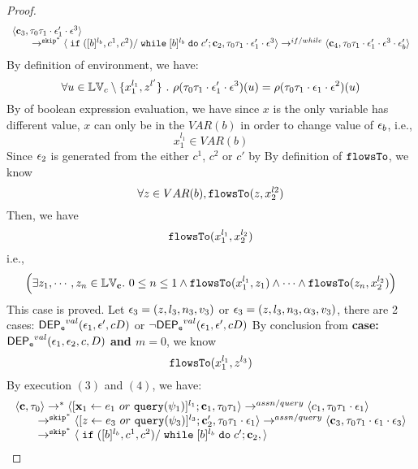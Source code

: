 \begin{proof}
\[\begin{array}{l}
  \langle {\boldsymbol{\mathbf{c}}}_3,  \mathtt{\tau}_0 \mathtt{\tau}_1 \cdot \mathtt{\epsilon}_1' \cdot \mathtt{\epsilon}^3 \rangle 
  \\ 
  \qquad \rightarrow^{\mathtt{skip}^*} 
  \langle \;\mathtt{if}\;([b]{}^{l_b}, c^1, c^2) / \;\mathtt{while}\; [b]{}^{l_b} \;\mathtt{do}\; c'; {\boldsymbol{\mathbf{c}}}_2, 
  \mathtt{\tau}_0 \mathtt{\tau}_1 \cdot \mathtt{\epsilon}_1' \cdot \mathtt{\epsilon}^3 \rangle 
  \rightarrow^{if / while} 
  \langle {\boldsymbol{\mathbf{c}}}_4,  \mathtt{\tau}_0 \mathtt{\tau}_1 \cdot \mathtt{\epsilon}_1' \cdot \mathtt{\epsilon}^3 \cdot \mathtt{\epsilon}_b' \rangle 
\end{array}
 \]
 By definition of environment, we have:
\[
  \forall u \in \mathbb{LV}_c \setminus \{x_1^{l_1}, z^{l'}\} ~.~
  \rho(\mathtt{\tau}_0 \mathtt{\tau}_1 \cdot \mathtt{\epsilon}_1' \cdot \mathtt{\epsilon}^3) (u) =  
  \rho(\mathtt{\tau}_0 \mathtt{\tau}_1 \cdot \mathtt{\epsilon}_1 \cdot \mathtt{\epsilon}^2) (u)
\]
%
By  of boolean expression evaluation, we have since $x$ is the only variable has different value, $x$ can only be in the $VAR(b)$ in order to change value of $\mathtt{\epsilon}_b$, i.e.,
 \[
  x_1^{l_1} \in VAR(b)
 \]
 Since $\mathtt{\epsilon}_2$ is generated from the either $c^1$, $c^2$ or $c'$ by 
 By definition of $\mathtt{flowsTo}$, we know
 \[
 \forall z \in VAR(b), \mathtt{flowsTo}(z, x_2^{l2})
 \]
 Then, we have
 \[
 \mathtt{flowsTo}(x_1^{l_1}, x_2^{l_2})
 \]
 i.e.,
 \[
 \Big( \exists z_1, \cdots, z_n \in \mathbb{LV}_{{\boldsymbol{\mathbf{c}}}}. ~ 0 \leq n \leq 1 \land
  \mathtt{flowsTo}(x_1^{l_1}, z_1) 
  \land \cdots \land \mathtt{flowsTo}(z_n, x_2^{l_2}) \Big)
 \]
  This case is proved.
%
\subcaseL{$\event_3 \in \eventset^{\asn}$}
Let $\mathtt{\epsilon}_3 = (z, l_3, n_3, v_3)$ or $\mathtt{\epsilon}_3 = (z, l_3, n_3, \alpha_3, v_3)$, there are 2 cases:
$\mathsf{DEP_{\mathtt{e}}}^{val}(\mathtt{\epsilon}_1, \mathtt{\epsilon}', c D)$ or $\neg \mathsf{DEP_{\mathtt{e}}}^{val}(\mathtt{\epsilon}_1, \mathtt{\epsilon}', c D)$
%
%
By conclusion from \textbf{case: $\mathsf{DEP_{\mathtt{e}}}^{val}(\mathtt{\epsilon}_1, \mathtt{\epsilon}_2, c, D)$ and $m = 0$}, we know
\[
  \mathtt{flowsTo}(x_1^{l_1}, z^{l_3})
\]
%
By execution $(3)$ and $(4)$, we have:
\[
  \begin{array}{l}   
  \langle {\boldsymbol{\mathbf{c}}}, \mathtt{\tau}_0 \rangle 
  \rightarrow^{*} 
  \langle [\mathrel{ {\boldsymbol{\mathbf{x}}}_1 \leftarrow e_1~ or ~ {\tt query}(\psi_1) }]^{l_1} ; {\boldsymbol{\mathbf{c}}}_1, \mathtt{\tau}_0 \mathtt{\tau}_1 \rangle  \rightarrow^{assn/query}
 \langle c_1, \mathtt{\tau}_0 \mathtt{\tau}_1 \cdot \mathtt{\epsilon}_1 \rangle 
  \\ 
  \qquad \rightarrow^{\mathtt{skip}^*} 
  \langle [\mathrel{ z \leftarrow e_3~ or ~ {\tt query}(\psi_3) }]^{l_3}; {\boldsymbol{\mathbf{c}}}_2', 
  \mathtt{\tau}_0 \mathtt{\tau}_1 \cdot \mathtt{\epsilon}_1 \rangle 
  \rightarrow^{assn / query} 
  \langle {\boldsymbol{\mathbf{c}}}_3,  \mathtt{\tau}_0 \mathtt{\tau}_1 \cdot \mathtt{\epsilon}_1 \cdot \mathtt{\epsilon}_3 \rangle 
  \\ 
  \qquad \rightarrow^{\mathtt{skip}^*} 
  \langle \;\mathtt{if}\;([b]{}^{l_b}, c^1, c^2) / \;\mathtt{while}\; [b]{}^{l_b} \;\mathtt{do}\; c'; {\boldsymbol{\mathbf{c}}}_2, 
 \rangle
\end{array}\]
\end{proof}

